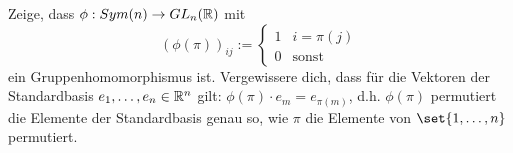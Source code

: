 \begin{sheet}
\begin{problem}[title={Permutationsmatrizen}]
Zeige, dass $\phi: Sym(n) \to GL_n(\mathbb{R})$ mit
\[(\phi(\pi))_{ij} := \begin{cases} 1 & i=\pi(j) \\ 0 & \text{sonst} \end{cases}\]
ein Gruppenhomomorphismus ist. Vergewissere dich, dass für die Vektoren der Standardbasis $e_1,\ldots,e_n\in\mathbb{R}^n$ gilt: $\phi(\pi)\cdot e_m = e_{\pi(m)}$, d.h. $\phi(\pi)$ permutiert die Elemente der Standardbasis genau so, wie $\pi$ die Elemente von $\set{1,\ldots,n}$ permutiert.
\end{problem}


\end{sheet}
